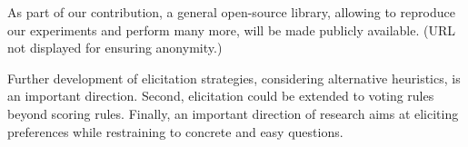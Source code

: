 \documentclass{article}
\begin{document}
As part of our contribution, a general open-source library, allowing to reproduce our experiments and perform many more, will be made publicly available. (URL not displayed for ensuring anonymity.)

Further development of elicitation strategies, considering alternative heuristics, is an important direction. 
Second, elicitation could be extended to voting rules beyond scoring rules. 
Finally, an important direction of research  aims at eliciting preferences while restraining to concrete and easy questions.





% 
%

\newpage

{\fontsize{9.7}{10.7}\selectfont }
\end{document}
